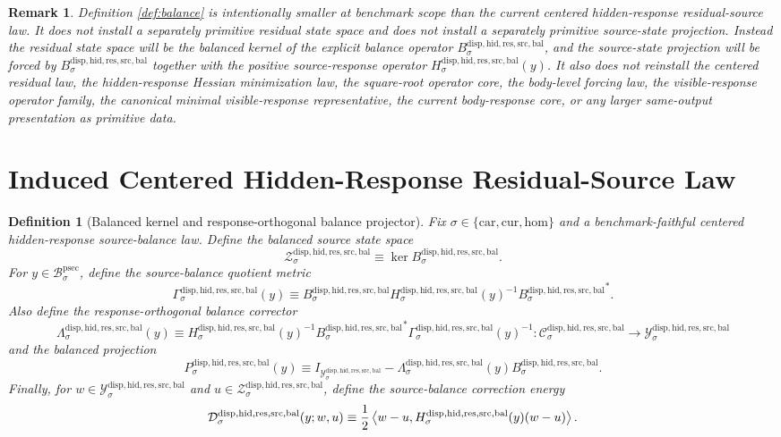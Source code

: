 \documentclass[11pt]{article}
\newcommand{\Car}{\mathrm{car}}
\newcommand{\Cur}{\mathrm{cur}}
\newcommand{\Hom}{\mathrm{hom}}
\newcommand{\ProtoSectionBody}[1]{\mathcal B_{#1}^{\mathrm{psec}}}
\newcommand{\BalancedSourceCarrier}[1]{\mathcal Y_{#1}^{\mathrm{disp,hid,res,src,bal}}}
\newcommand{\SourceBalanceTarget}[1]{\mathcal C_{#1}^{\mathrm{disp,hid,res,src,bal}}}
\newcommand{\SourceBalanceOperator}[1]{B_{#1}^{\mathrm{disp,hid,res,src,bal}}}
\newcommand{\SourceBalancedState}[1]{\mathcal Z_{#1}^{\mathrm{disp,hid,res,src,bal}}}
\newcommand{\SourceBalanceResponse}[1]{H_{#1}^{\mathrm{disp,hid,res,src,bal}}}
\newcommand{\SourceBalanceQuotientMetric}[1]{\Gamma_{#1}^{\mathrm{disp,hid,res,src,bal}}}
\newcommand{\SourceBalanceCorrector}[1]{\Lambda_{#1}^{\mathrm{disp,hid,res,src,bal}}}
\newcommand{\BalancedProjection}[1]{P_{#1}^{\mathrm{disp,hid,res,src,bal}}}
\newcommand{\SourceBalanceCorrectionEnergy}[1]{\mathcal D_{#1}^{\mathrm{disp,hid,res,src,bal}}}
\newtheorem{definition}{Definition}
\newtheorem{remark}{Remark}
\begin{document}
\begin{remark}
Definition \ref{def:balance} is intentionally smaller at benchmark scope than the current centered hidden-response residual-source law. It does not install a separately primitive residual state space and does not install a separately primitive source-state projection. Instead the residual state space will be the balanced kernel of the explicit balance operator \(\SourceBalanceOperator{\sigma}\), and the source-state projection will be forced by \(\SourceBalanceOperator{\sigma}\) together with the positive source-response operator \(\SourceBalanceResponse{\sigma}(y)\). It also does not reinstall the centered residual law, the hidden-response Hessian minimization law, the square-root operator core, the body-level forcing law, the visible-response operator family, the canonical minimal visible-response representative, the current body-response core, or any larger same-output presentation as primitive data.
\end{remark}

\section{Induced Centered Hidden-Response Residual-Source Law}

\begin{definition}[Balanced kernel and response-orthogonal balance projector]
\label{def:projector}
Fix \(\sigma\in\{\Car,\Cur,\Hom\}\) and a benchmark-faithful centered hidden-response source-balance law. Define the balanced source state space
\[
\SourceBalancedState{\sigma}
\equiv
\ker \SourceBalanceOperator{\sigma}.
\]
For \(y\in\ProtoSectionBody{\sigma}\), define the source-balance quotient metric
\begin{equation}
\SourceBalanceQuotientMetric{\sigma}(y)
\equiv
\SourceBalanceOperator{\sigma}
\SourceBalanceResponse{\sigma}(y)^{-1}
{\SourceBalanceOperator{\sigma}}^{*}.
\label{eq:balancequotient}
\end{equation}
Also define the response-orthogonal balance corrector
\begin{equation}
\SourceBalanceCorrector{\sigma}(y)
\equiv
\SourceBalanceResponse{\sigma}(y)^{-1}
{\SourceBalanceOperator{\sigma}}^{*}
\SourceBalanceQuotientMetric{\sigma}(y)^{-1}
:
\SourceBalanceTarget{\sigma}\to\BalancedSourceCarrier{\sigma}
\label{eq:corrector}
\end{equation}
and the balanced projection
\begin{equation}
\BalancedProjection{\sigma}(y)
\equiv
I_{\BalancedSourceCarrier{\sigma}}
-\SourceBalanceCorrector{\sigma}(y)\SourceBalanceOperator{\sigma}.
\label{eq:projector}
\end{equation}
Finally, for \(w\in\BalancedSourceCarrier{\sigma}\) and \(u\in\SourceBalancedState{\sigma}\), define the source-balance correction energy
\[
\SourceBalanceCorrectionEnergy{\sigma}(y;w,u)
\equiv
\frac{1}{2}
\ev{
w-u,
\SourceBalanceResponse{\sigma}(y)(w-u)
}.
\]
\end{definition}
\end{document}
